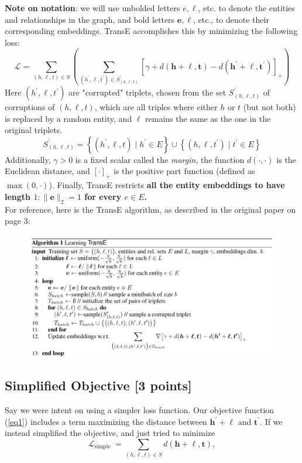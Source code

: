 \documentclass[11pt]{article}
\numberwithin{figure}{section}
\begin{document}
\textbf{Note on notation}: we will use unbolded letters $e, \ell$, etc. to denote the entities and relationships in the graph, and bold letters $\mathbf{e}, \boldsymbol{\ell}$, etc., to denote their corresponding embeddings.
TransE accomplishes this by minimizing the following loss:
\begin{equation}\label{eq1}
\mathcal{L}=\sum_{(h, \ell, t) \in S}\left(\sum_{\left(h^{\prime}, \ell, t^{\prime}\right) \in S_{(h, \ell, t)}^{\prime}}\left[\gamma+d(\mathbf{h}+\boldsymbol{\ell}, \mathbf{t})-d\left(\mathbf{h}^{\prime}+\boldsymbol{\ell}, \mathbf{t}^{\prime}\right)\right]_{+}\right)
\end{equation}
Here $\left(h^{\prime}, \ell, t^{\prime}\right)$ are "corrupted" triplets, chosen from the set $S_{(h, \ell, t)}^{\prime}$ of corruptions of $(h, \ell, t)$, which are all triples where either $h$ or $t$ (but not both) is replaced by a random entity, and $\ell$ remains the same as the one in the original triplets.
$$
S_{(h, \ell, t)}^{\prime}=\left\{\left(h^{\prime}, \ell, t\right) \mid h^{\prime} \in E\right\} \cup\left\{\left(h, \ell, t^{\prime}\right) \mid t^{\prime} \in E\right\}
$$
Additionally, $\gamma>0$ is a fixed scalar called the \textit{margin}, the function $d(\cdot, \cdot)$ is the Euclidean distance, and $[\cdot]_{+}$ is the positive part function (defined as $\max (0, \cdot)$). Finally, TransE restricts \textbf{all the entity embeddings to have length $1:\|\mathbf{e}\|_2=1$ for every $e \in E$.}\\
For reference, here is the TransE algorithm, as described in the original paper on page 3:
\begin{figure}[H]
    \centering
    \includegraphics[width=1.0\textwidth]{CS224W_Homework2/algo2.png}
    \label{fig:algo2}
\end{figure}

\subsection{Simplified Objective [3 points]}
Say we were intent on using a simpler loss function. Our objective function (\ref{eq1}) includes a term maximizing the distance between $\mathbf{h}^{\prime}+\boldsymbol{\ell}$ and $\mathbf{t}^{\prime}$. If we instead simplified the objective, and just tried to minimize
\begin{equation}\label{eq2}
\mathcal{L}_{\text {simple }}=\sum_{(h, \ell, t) \in S} d(\mathbf{h}+\boldsymbol{\ell}, \mathbf{t}),
\end{equation}
\end{document}
